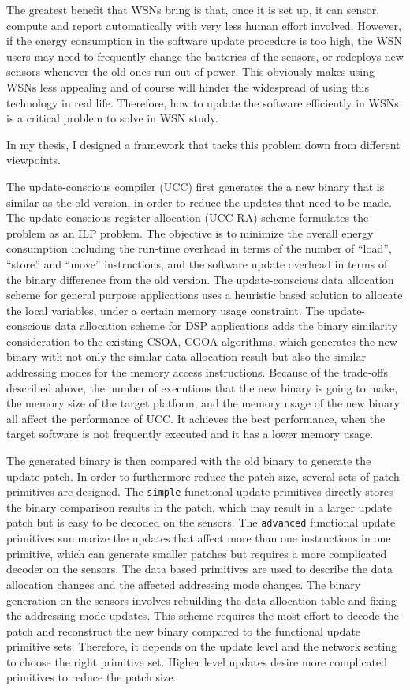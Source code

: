 The greatest benefit that WSNs bring is that, once it is set up, it can sensor, compute and report automatically with very less human effort involved. However, if the energy consumption in the software update procedure is too high, the WSN users may need to frequently change the batteries of the sensors, or redeploys new sensors  whenever the old ones run out of power. This obviously makes using WSNs less appealing and of course will hinder the widespread of using this technology in real life. Therefore, how to update the software efficiently in WSNs is a critical  problem to solve in WSN study.

In my thesis, I designed a framework that tacks this problem down from different viewpoints. 

The update-conscious compiler (UCC) first generates the a new binary that is similar as the old version, in order to reduce the updates that need to be made. The update-conscious register allocation (UCC-RA) scheme formulates the problem as an ILP problem. The objective is to minimize the overall energy consumption including the run-time overhead in terms of the number of ``load'', ``store'' and ``move'' instructions, and the software update overhead in terms of the binary difference from the old version. The update-conscious data allocation scheme for general purpose applications uses a heuristic based solution to allocate the local variables, under a certain memory usage constraint. The update-conscious data allocation scheme for DSP applications adds the binary similarity consideration to the existing CSOA, CGOA algorithms, which generates the new binary with not only the similar data allocation result but also the similar addressing modes for the memory access instructions.
Because of the trade-offs described above, the number of executions that the new binary is going to make, the memory size of the target platform, and the memory usage of the new binary all affect the performance of UCC. It achieves the best performance, when the target software is not frequently executed and it has a lower memory usage. 

The generated binary is then compared with the old binary to generate the update patch. In order to furthermore reduce the patch size, several sets of patch primitives are designed. The {\tt simple} functional update primitives directly stores the binary comparison results in the patch, which may result in a larger update patch but is easy to be decoded on the sensors. The {\tt advanced} functional update primitives summarize the updates that affect more than one instructions in one primitive, which can generate smaller patches but requires a more complicated decoder on the sensors. The data based primitives are used to describe the data allocation changes and the affected addressing mode changes. The binary generation on the sensors involves rebuilding the data allocation table and fixing the addressing mode updates. This scheme requires the most effort to decode the patch and reconstruct the new binary compared to the functional update primitive sets. 
Therefore, it depends on the update level and the network setting to choose the right primitive set. Higher level updates desire more complicated primitives to reduce the patch size.

